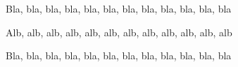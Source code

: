 \documentclass[10pt, a4paper]{../main/main}
\begin{document}
Bla, bla, bla, bla, bla, bla, bla, bla, bla, bla, bla, bla

\tdocsep

Alb, alb, alb, alb, alb, alb, alb, alb, alb, alb, alb, alb

\vspace{22.75cm}

\tdocsep

Bla, bla, bla, bla, bla, bla, bla, bla, bla, bla, bla, bla
\end{document}

